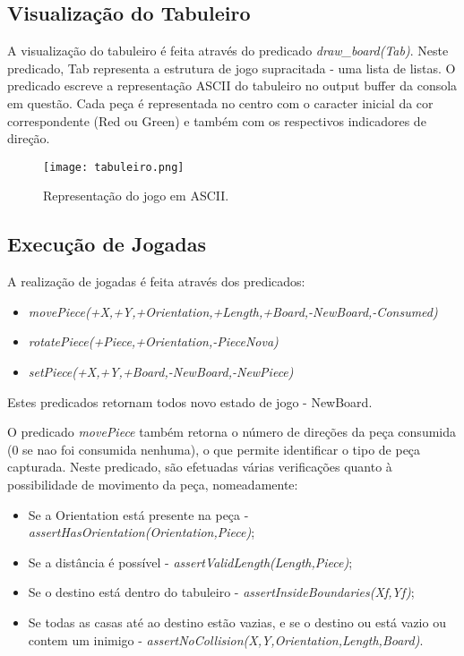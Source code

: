 \documentclass[a4paper]{article}
\begin{document}
\subsection{Visualização do Tabuleiro}%
A visualização do tabuleiro é feita através do predicado \textit{draw\_board(Tab)}. Neste predicado, Tab representa a estrutura de jogo supracitada - uma lista de listas. O predicado escreve a representação ASCII do tabuleiro no output buffer da consola em questão. Cada peça é representada no centro com o caracter inicial da cor correspondente (Red ou Green) e também com os respectivos indicadores de direção.

\begin{figure}[ht]
\caption{Representação do jogo em ASCII.}
\centering
\texttt{[image: tabuleiro.png]}
\end{figure}

\subsection{Execução de Jogadas}%
A realização de jogadas é feita através dos predicados:

\begin{itemize}
  \item \textit{movePiece(+X,+Y,+Orientation,+Length,+Board,-NewBoard,-Consumed)}
  \item \textit{rotatePiece(+Piece,+Orientation,-PieceNova)}
  \item \textit{setPiece(+X,+Y,+Board,-NewBoard,-NewPiece)}
\end{itemize}

Estes predicados retornam todos novo estado de jogo - NewBoard.

O predicado \textit{movePiece} também retorna o número de direções da peça consumida (0 se nao foi consumida nenhuma), o que permite identificar o tipo de peça capturada.
Neste predicado, são efetuadas várias verificações quanto à possibilidade de movimento da peça, nomeadamente:
\begin{itemize}
  \item Se a Orientation está presente na peça - \textit{assertHasOrientation(Orientation,Piece)};
  \item Se a distância é possível - \textit{assertValidLength(Length,Piece)};
  \item Se o destino está dentro do tabuleiro - \textit{assertInsideBoundaries(Xf,Yf)};
  \item Se todas as casas até ao destino estão vazias, e se o destino ou está vazio ou contem um inimigo - \textit{assertNoCollision(X,Y,Orientation,Length,Board)}.
\end{itemize}
\end{document}
